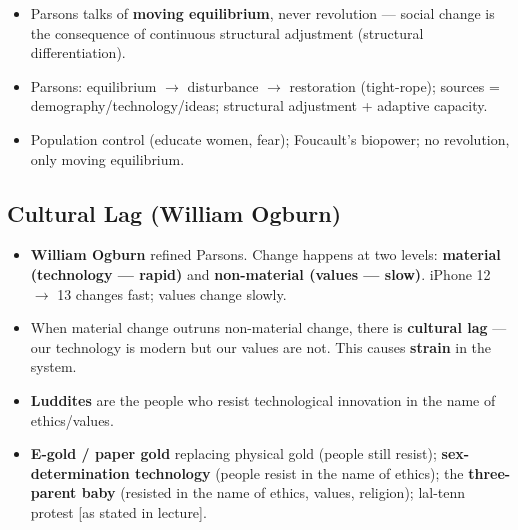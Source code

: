 \begin{CriticalPoint}
\begin{itemize}
    \item Parsons talks of \textbf{moving equilibrium}, never revolution --- social change is the consequence of continuous structural adjustment (structural differentiation).
\end{itemize}
\end{CriticalPoint}

\begin{QuickRevision}
\begin{itemize}
    \item Parsons: equilibrium $\rightarrow$ disturbance $\rightarrow$ restoration (tight-rope); sources = demography/technology/ideas; structural adjustment + adaptive capacity.
    \item Population control (educate women, fear); Foucault's biopower; no revolution, only moving equilibrium.
\end{itemize}
\end{QuickRevision}

\sectiondivider

\subsection{Cultural Lag (William Ogburn)}

\begin{KeyConcept}
\begin{itemize}
    \item \textbf{William Ogburn} refined Parsons. Change happens at two levels: \textbf{material (technology --- rapid)} and \textbf{non-material (values --- slow)}. iPhone 12 $\rightarrow$ 13 changes fast; values change slowly.
    \item When material change outruns non-material change, there is \textbf{cultural lag} --- our technology is modern but our values are not. This causes \textbf{strain} in the system.
    \item \textbf{Luddites} are the people who resist technological innovation in the name of ethics/values.
\end{itemize}
\end{KeyConcept}

\begin{ExampleBox}
\begin{itemize}
    \item \textbf{E-gold / paper gold} replacing physical gold (people still resist); \textbf{sex-determination technology} (people resist in the name of ethics); the \textbf{three-parent baby} (resisted in the name of ethics, values, religion); lal-tenn protest [as stated in lecture].
\end{itemize}
\end{ExampleBox}

